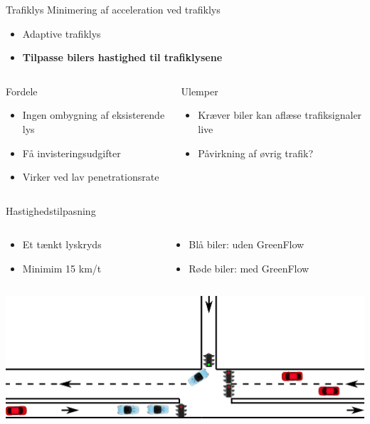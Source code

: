 \begin{frame}{Trafiklys}
Minimering af acceleration ved trafiklys
\begin{itemize}
\item Adaptive trafiklys
\item \textbf{Tilpasse bilers hastighed til trafiklysene}
\end{itemize}


\begin{center}
\begin{columns}
\begin{column}{0.4\textwidth}
Fordele
\begin{itemize}
\item Ingen ombygning af eksisterende lys
\item Få invisteringsudgifter 
\item Virker ved lav penetrationsrate
\end{itemize}
\end{column}

\begin{column}{0.5\textwidth}
Ulemper
\begin{itemize}
\item Kræver biler kan aflæse trafiksignaler live
\item Påvirkning af øvrig trafik?
\end{itemize}
\vspace{8mm}
\end{column}
\end{columns}
\end{center}
\end{frame}

\begin{frame}{Hastighedstilpasning}
\begin{columns}
\begin{column}{0.4\textwidth}
\begin{itemize}
\item Et tænkt lyskryds
\item Minimim 15 km/t
\end{itemize}
\end{column}
\begin{column}{0.6\textwidth}
\begin{itemize}
\item Blå biler: uden GreenFlow
\item Røde biler: med GreenFlow
\end{itemize}
\end{column}
\end{columns}

\vspace{3mm}
\includegraphics[width=1\textwidth]{../images/introNetworkSimple.png}
\end{frame}

